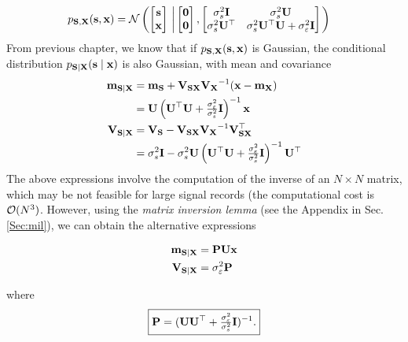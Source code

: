 \begin{align}
p_{{\bf S},{\bf X}}({\mathbf s},{\mathbf x}) 
	&= {\mathcal N}\left(
	      \begin{bmatrix} {\mathbf s} \\ {\mathbf x} \end{bmatrix}
          \, \left| \,	                
	      \begin{bmatrix} {\bf 0} \\ {\bf 0} \end{bmatrix},
          \begin{bmatrix} \sigma_s^2{\mathbf I}     & \sigma_s^2{\mathbf U} \\ 
                          \sigma_s^2{\mathbf U}^\top & \sigma_s^2{\mathbf U}^\top{\mathbf U} + 
                                               \sigma_\varepsilon^2 {\mathbf I}
          \end{bmatrix}
          \right.
          \right)
\label{eq:jointsx}
\end{align}
From previous chapter, we know that if $p_{{\bf S},{\bf X}}({\mathbf s},{\mathbf x}) $ is Gaussian, the conditional distribution $p_{{\bf S}|{\bf X}}({\mathbf s} \mid {\mathbf x}) $ is also Gaussian, with mean and covariance
\begin{align}
\label{Filt:msx}
{\bf m}_{{\bf S}|{\bf X}} 
      &= {\bf m}_{\bf S} + {\bf V}_{\bf SX}{\bf V_X}^{-1}({\bf x}-{\bf m}_{\bf X})    \nonumber \\
      &= {\mathbf U} \left({\mathbf U}^\top{\mathbf U} + \tfrac{\sigma_\varepsilon^2}{\sigma_s^2} {\mathbf I} \right)^{-1}{\mathbf x} \\
\label{Filt:vsx}
{\bf V}_{{\bf S}|{\bf X}} 
      &= {\bf V_S}- {\bf V}_{\bf SX}{\bf V_X}^{-1}{\bf V}_{\bf SX}^\top                \nonumber\\
      &= \sigma_s^2{\mathbf I} 
       - \sigma_s^2{\mathbf U} 
         \left({\mathbf U}^\top {\mathbf U} + \tfrac{\sigma_\varepsilon^2}{\sigma_s^2}{\mathbf I}\right)^{-1} {\mathbf U}^\top   
\end{align}
The above expressions involve the computation of the inverse of an $N\times N$ matrix, which may be not feasible for large signal records (the computational cost is ${\mathcal O} (N^3)$. However, using the {\em matrix inversion lemma} (see the Appendix in Sec. \ref{Sec:mil}), we can obtain the alternative expressions
\begin{framed}
\begin{align}
\label{Filt:sMMSEgaussMN2}
{\bf m}_{{\bf S}|{\bf X}} &= {\mathbf P} {\mathbf U} {\mathbf x}         \\
{\bf V}_{{\bf S}|{\bf X}} &= \sigma_\varepsilon^2 {\mathbf P}   
\end{align}\end{framed}
where
\begin{equation}
\label{Filt:Pdef}
\boxed{{\mathbf P} = ({\mathbf U}{\mathbf U}^\top  + \tfrac{\sigma_\varepsilon^2}{\sigma_s^2}{\mathbf I})^{-1}.}
\end{equation}

